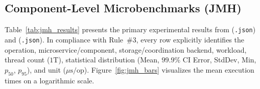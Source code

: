 \documentclass[10pt,a4paper]{article}
\begin{document}
\subsection{Component-Level Microbenchmarks (JMH)}
\label{subsec:jmh_results}

Table~\ref{tab:jmh_results} presents the primary experimental results from  (\texttt{.json}) and  (\texttt{.json}). In compliance with Rule~\#3, every row explicitly identifies the operation, microservice/component, storage/coordination backend, workload, thread count ($1\text{T}$), statistical distribution (Mean, $99.9\%$ CI Error, StdDev, Min, $p_{50}$, $p_{95}$), and unit ($\mu\text{s/op}$). Figure~\ref{fig:jmh_bars} visualizes the mean execution times on a logarithmic scale.
\end{document}
